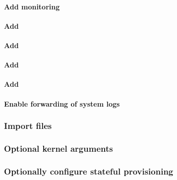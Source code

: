 \documentclass[letterpaper]{article}
\begin{document}
\clearpage
\paragraph{Add \Ganglia{} monitoring}


\paragraph{Add \clustershell{}}


\paragraph{Add \mrsh{}}


\paragraph{Add \genders{}}


\paragraph{Add \conman{}} \label{sec:add_conman}


\clearpage
\paragraph{Enable forwarding of system logs} \label{sec:add_syslog}


\subsubsection{Import files} \label{sec:file_import}








\subsubsection{Optional kernel arguments} \label{sec:optional_kargs}


\subsubsection{Optionally configure stateful provisioning}

\end{document}
